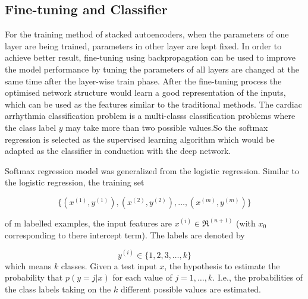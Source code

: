 \documentclass{bmcart}
\begin{document}
\subsection*{Fine-tuning and Classifier}
For the training method of stacked autoencoders, when the parameters of one layer are being trained, parameters in other layer are kept fixed. In order to achieve better result, fine-tuning using backpropagation can be used to improve the model performance by tuning the parameters of all layers are changed at the same time after the layer-wise train phase. After the fine-tuning process the optimised network structure would learn a good representation of the inputs, which can be used as the features similar to the traditional methods. The cardiac arrhythmia classification problem is a multi-classs classification problems where the class label $y$ may take more than two possible values.So the softmax regression is selected as the supervised learning algorithm which would be adapted as the classifier in conduction with the deep network.

Softmax regression model was generalized  from the logistic regression. Similar to the logistic regression, the training set

\begin{equation}
\{(x^{(1)},y^{(1)}), (x^{(2)},y^{(2)}), \ldots, (x^{(m)},y^{(m)}) \}
\end{equation}

\noindent of m labelled examples, the input features are $x^{(i)} \in \Re^{(n+1)}$ (with $x_0$ corresponding to there intercept term). The labels are denoted by 

\begin{equation}
y^{(i)} \in \{1,2,3,\ldots,k\}
\end{equation}
\noindent which means $k$ classes.
Given a test input $x$, the hypothesis to estimate the probability that $p(y=j|x)$ for each value of $j=1,\ldots,k$. I.e., the probabilities of the class labels taking on the $k$ different possible values are estimated. 
\end{document}
